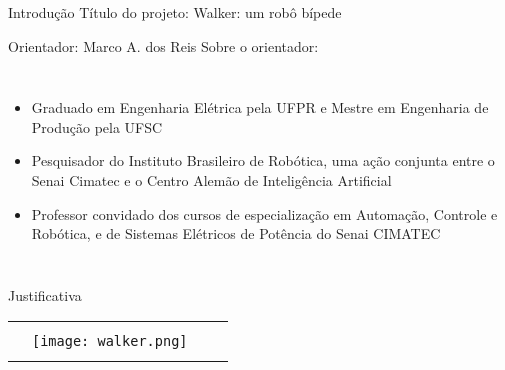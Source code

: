 \begin{frame}[t]{Introdução} 
    \transdissolve[duration=0.5]
    Título do projeto: Walker: um robô bípede

    Orientador: Marco A. dos Reis
    \newline
    \newline
    Sobre o orientador:
        \begin{columns}[t]
                \begin{itemize}
                    \item Graduado em Engenharia Elétrica pela UFPR e Mestre em Engenharia de Produção pela UFSC
                    \item Pesquisador do Instituto Brasileiro de Robótica, uma ação conjunta entre o Senai Cimatec e o Centro Alemão de Inteligência Artificial
                    \item Professor convidado dos cursos de especialização em Automação, Controle e Robótica, e de Sistemas Elétricos de Potência do Senai CIMATEC
                \end{itemize}
        \end{columns}
\end{frame}
\begin{frame}[c]{Justificativa}
    \begin{tabular}{cccc}
        \rule{60pt}{0ex}  &   \texttt{[image: walker.png]}
    \end{tabular}

\end{frame}
